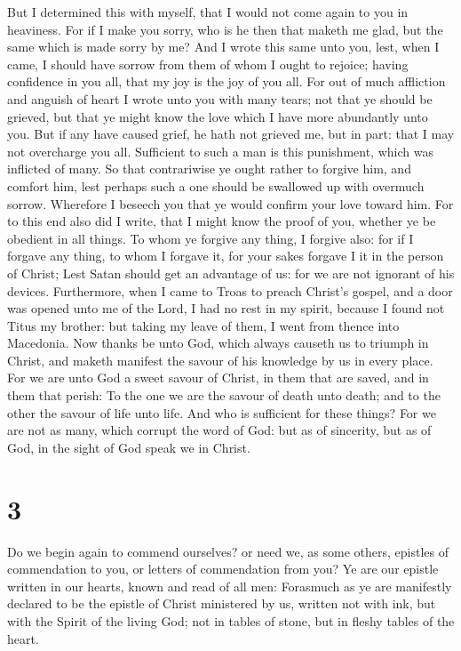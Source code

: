  But I determined this with myself, that I would not come
again to you in heaviness.  For if I make you sorry, who is
he then that maketh me glad, but the same which is made sorry by me?
 And I wrote this same unto you, lest, when I came, I should
have sorrow from them of whom I ought to rejoice; having confidence in
you all, that my joy is the joy of you all.  For out of much
affliction and anguish of heart I wrote unto you with many tears; not
that ye should be grieved, but that ye might know the love which I have
more abundantly unto you.  But if any have caused grief, he
hath not grieved me, but in part: that I may not overcharge you all.
 Sufficient to such a man is this punishment, which was
inflicted of many.  So that contrariwise ye ought rather to
forgive him, and comfort him, lest perhaps such a one should be
swallowed up with overmuch sorrow.  Wherefore I beseech you
that ye would confirm your love toward him.  For to this end
also did I write, that I might know the proof of you, whether ye be
obedient in all things.  To whom ye forgive any thing, I
forgive also: for if I forgave any thing, to whom I forgave it, for your
sakes forgave I it in the person of Christ;  Lest Satan
should get an advantage of us: for we are not ignorant of his devices.
 Furthermore, when I came to Troas to preach Christ's
gospel, and a door was opened unto me of the Lord,  I had
no rest in my spirit, because I found not Titus my brother: but taking
my leave of them, I went from thence into Macedonia.  Now
thanks be unto God, which always causeth us to triumph in Christ, and
maketh manifest the savour of his knowledge by us in every place.
 For we are unto God a sweet savour of Christ, in them that
are saved, and in them that perish:  To the one we are the
savour of death unto death; and to the other the savour of life unto
life. And who is sufficient for these things?  For we are
not as many, which corrupt the word of God: but as of sincerity, but as
of God, in the sight of God speak we in Christ.

\hypertarget{section-2}{%
\section{3}\label{section-2}}

 Do we begin again to commend ourselves? or need we, as some
others, epistles of commendation to you, or letters of commendation from
you?  Ye are our epistle written in our hearts, known and
read of all men:  Forasmuch as ye are manifestly declared to
be the epistle of Christ ministered by us, written not with ink, but
with the Spirit of the living God; not in tables of stone, but in fleshy
tables of the heart.


